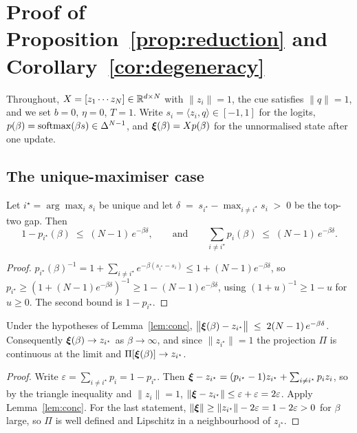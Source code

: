 \section{Proof of Proposition~\ref{prop:reduction} and Corollary~\ref{cor:degeneracy}}
\label{app:proof}

Throughout, $X = [z_1\cdots z_N] \in \mathbb{R}^{d\times N}$ with $\|z_i\|=1$, the cue satisfies
$\|q\|=1$, and we set $b=0$, $\eta=0$, $T=1$. Write $s_i = \langle z_i,q\rangle \in [-1,1]$
for the logits, $p(\beta) = \operatorname{softmax}(\beta s) \in \Delta^{N-1}$, and
$\boldsymbol{\xi}(\beta) = X p(\beta)$ for the unnormalised state after one update.

\subsection{The unique-maximiser case}

\begin{lemma}
\label{lem:conc}
Let $i^\star = \arg\max_i s_i$ be unique and let
$\delta \;=\; s_{i^\star} - \max_{i\neq i^\star} s_i \;>\;0$
be the top-two gap. Then
\[
1 - p_{i^\star}(\beta) \;\le\; (N-1)\,e^{-\beta\delta},
\qquad\text{and}\qquad
\sum_{i\neq i^\star} p_i(\beta) \;\le\; (N-1)\,e^{-\beta\delta}.
\]
\end{lemma}

\begin{proof}
$p_{i^\star}(\beta)^{-1} = 1 + \sum_{i\neq i^\star} e^{-\beta(s_{i^\star}-s_i)}
\le 1 + (N-1)e^{-\beta\delta}$, so
$p_{i^\star} \ge (1+(N-1)e^{-\beta\delta})^{-1} \ge 1-(N-1)e^{-\beta\delta}$,
using $(1+u)^{-1}\ge 1-u$ for $u\ge 0$. The second bound is $1-p_{i^\star}$.
\end{proof}

\begin{lemma}
\label{lem:state}
Under the hypotheses of Lemma~\ref{lem:conc},
$\big\|\boldsymbol{\xi}(\beta) - z_{i^\star}\big\| \;\le\; 2(N-1)\,e^{-\beta\delta}$.
Consequently $\boldsymbol{\xi}(\beta)\to z_{i^\star}$ as $\beta\to\infty$, and since
$\|z_{i^\star}\|=1$ the projection $\Pi$ is continuous at the limit and
$\Pi[\boldsymbol{\xi}(\beta)]\to z_{i^\star}$.
\end{lemma}

\begin{proof}
Write $\varepsilon = \sum_{i\neq i^\star}p_i = 1-p_{i^\star}$. Then
$\boldsymbol{\xi} - z_{i^\star} = (p_{i^\star}-1)z_{i^\star} + \sum_{i\neq i^\star}p_i z_i$, so by the
triangle inequality and $\|z_i\|=1$, $\|\boldsymbol{\xi} - z_{i^\star}\| \le \varepsilon + \varepsilon
= 2\varepsilon$. Apply Lemma~\ref{lem:conc}. For the last statement, $\|\boldsymbol{\xi}\| \ge
\|z_{i^\star}\| - 2\varepsilon = 1-2\varepsilon > 0$ for $\beta$ large, so $\Pi$ is
well defined and Lipschitz in a neighbourhood of $z_{i^\star}$.
\end{proof}

